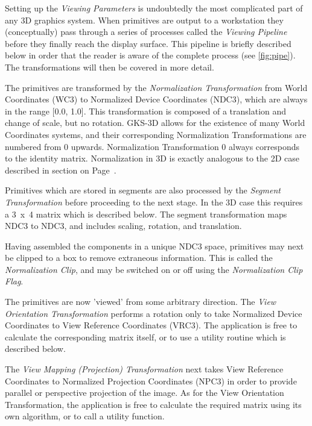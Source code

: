 Setting up the {\it Viewing Parameters} is undoubtedly the most
complicated part of any 3D graphics system. When primitives are output
to a workstation they (conceptually) pass through a series of processes
called the {\it Viewing Pipeline} before they finally reach the
display surface. This pipeline is briefly described below in order that
the reader is aware of the complete process (see \ref{fig:pipe}).
The transformations will then be covered in more detail.
\begin{OL}
\item The primitives are transformed by the {\it Normalization
Transformation} from World Coordinates (WC3) to Normalized
Device Coordinates (NDC3), which are always in the range [0.0, 1.0].
This transformation is composed of a translation and change of scale,
but no rotation. GKS-3D allows for the existence of many World
Coordinates systems, and their corresponding Normalization
Transformations are numbered from 0 upwards. Normalization
Transformation 0 always corresponds to the identity matrix.
Normalization in 3D is exactly analogous to the 2D case described
in section on Page~\pageref{sec:nortrn}.
\item Primitives which are stored in segments are also processed by the
{\it Segment Transformation} before proceeding to the next stage.
In the 3D case this requires a 3~x~4 matrix which is
described below. The segment transformation maps NDC3 to NDC3,
and includes scaling, rotation, and translation.
\item Having assembled the components in a unique NDC3 space,
primitives may next be clipped to a box to remove extraneous
information. This is called the {\it Normalization Clip}, and may be
switched on or off using the {\it Normalization Clip Flag}.
\item The primitives are now 'viewed' from some arbitrary direction.
The {\it View Orientation Transformation} performs a rotation only
to take Normalized Device Coordinates to View Reference Coordinates
(VRC3). The application is free to calculate the corresponding matrix
itself, or to use a utility routine which is described below.
\item The {\it View Mapping (Projection) Transformation} next takes
View Reference Coordinates to Normalized Projection Coordinates
(NPC3)
in order to provide parallel or perspective projection of the image.
As for the View Orientation Transformation, the application is free
to calculate the required matrix using its own algorithm, or to call a
utility function.
\begin{figure}[h]

\end{figure}
\end{OL}
